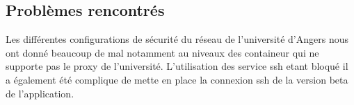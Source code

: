 \subsection{Problèmes rencontrés} 

Les différentes configurations de sécurité du réseau de l’université d’Angers nous ont donné beaucoup de mal notamment au niveaux des containeur qui ne supporte pas le proxy de l’université. L’utilisation des service ssh etant bloqué il a également été complique de mette en place la connexion ssh de la version beta de l’application. 
